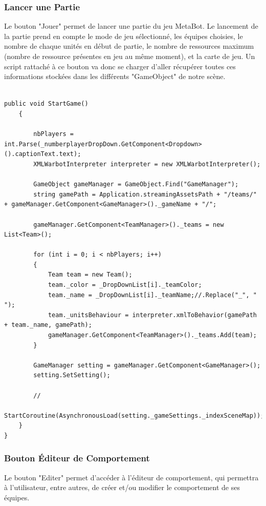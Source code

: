 \documentclass{report}
\begin{document}
\subsubsection{Lancer une Partie}
Le bouton "Jouer" permet de lancer une partie du jeu MetaBot. Le lancement de la partie prend en compte le mode de jeu sélectionné, les équipes choisies, le nombre de chaque unités en début de partie, le nombre de ressources maximum (nombre de ressource présentes en jeu au même moment), et la carte de jeu. Un script rattaché à ce bouton va donc se charger d'aller récupérer toutes ces informations stockées dans les différents "GameObject" de notre scène.

\begin{lstlisting}[language={[Sharp]C},label={lst:StartGame()}, caption= Extrait du code de PlayButton.cs]

public void StartGame()
    {
        
        nbPlayers = int.Parse(_numberplayerDropDown.GetComponent<Dropdown>().captionText.text);
        XMLWarbotInterpreter interpreter = new XMLWarbotInterpreter();

        GameObject gameManager = GameObject.Find("GameManager");
        string gamePath = Application.streamingAssetsPath + "/teams/" + gameManager.GetComponent<GameManager>()._gameName + "/";
        
        gameManager.GetComponent<TeamManager>()._teams = new List<Team>();

        for (int i = 0; i < nbPlayers; i++)
        {
            Team team = new Team();
            team._color = _DropDownList[i]._teamColor;
            team._name = _DropDownList[i]._teamName;//.Replace("_", " ");
            team._unitsBehaviour = interpreter.xmlToBehavior(gamePath + team._name, gamePath);
            gameManager.GetComponent<TeamManager>()._teams.Add(team);
        }

        GameManager setting = gameManager.GetComponent<GameManager>();
        setting.SetSetting();

        //
        StartCoroutine(AsynchronousLoad(setting._gameSettings._indexSceneMap));
    }
}
\end{lstlisting}


\subsubsection{Bouton Éditeur de Comportement}
Le bouton "Editer" permet d'accéder à l'éditeur de comportement, qui permettra à l'utilisateur, entre autres, de créer et/ou modifier le comportement de ses équipes.
\end{document}
